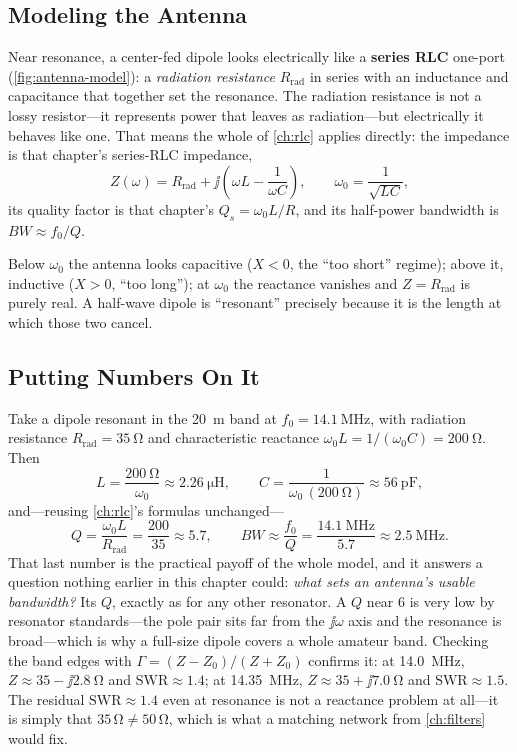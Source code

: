 \subsection{Modeling the Antenna}
Near resonance, a center-fed dipole looks electrically like a \textbf{series RLC}
one-port (\cref{fig:antenna-model}): a \emph{radiation resistance} \(R_{\text{rad}}\)
in series with an inductance and capacitance that together set the resonance. The
radiation resistance is not a lossy resistor---it represents power that leaves as
radiation---but electrically it behaves like one. That means the whole of
\cref{ch:rlc} applies directly: the impedance is that chapter's series-RLC impedance,
\[
Z(\omega)=R_{\text{rad}}+\jj\left(\omega L-\frac{1}{\omega C}\right),
\qquad
\omega_0=\frac{1}{\sqrt{LC}} ,
\]
its quality factor is that chapter's \(Q_s=\omega_0L/R\), and its half-power
bandwidth is \(BW\approx f_0/Q\).

Below \(\omega_0\) the antenna looks capacitive (\(X<0\), the ``too short''
regime); above it, inductive (\(X>0\), ``too long''); at \(\omega_0\) the
reactance vanishes and \(Z=R_{\text{rad}}\) is purely real. A half-wave dipole is
``resonant'' precisely because it is the length at which those two cancel.

\subsection{Putting Numbers On It}
Take a dipole resonant in the \SI{20}{\meter} band at
\(f_0=\SI{14.1}{\mega\hertz}\), with radiation resistance
\(R_{\text{rad}}=\SI{35}{\ohm}\) and characteristic reactance
\(\omega_0L=1/(\omega_0C)=\SI{200}{\ohm}\). Then
\[
L=\frac{\SI{200}{\ohm}}{\omega_0}\approx\SI{2.26}{\micro\henry},
\qquad
C=\frac{1}{\omega_0\,(\SI{200}{\ohm})}\approx\SI{56}{\pico\farad},
\]
and---reusing \cref{ch:rlc}'s formulas unchanged---
\[
Q=\frac{\omega_0L}{R_{\text{rad}}}=\frac{200}{35}\approx5.7,
\qquad
BW\approx\frac{f_0}{Q}=\frac{\SI{14.1}{\mega\hertz}}{5.7}\approx\SI{2.5}{\mega\hertz}.
\]
That last number is the practical payoff of the whole model, and it answers a
question nothing earlier in this chapter could: \emph{what sets an antenna's usable
bandwidth?} Its \(Q\), exactly as for any other resonator. A \(Q\) near \(6\) is very
low by resonator standards---the pole pair sits far from the \(\jj\omega\) axis and
the resonance is broad---which is why a full-size dipole covers a whole amateur band.
Checking the band edges with \(\Gamma=(Z-Z_0)/(Z+Z_0)\) confirms it: at
\SI{14.0}{\mega\hertz}, \(Z\approx35-\jj2.8\ \si{\ohm}\) and
\(\mathrm{SWR}\approx1.4\); at \SI{14.35}{\mega\hertz},
\(Z\approx35+\jj7.0\ \si{\ohm}\) and \(\mathrm{SWR}\approx1.5\). The residual
\(\mathrm{SWR}\approx1.4\) even at resonance is not a reactance problem at all---it is
simply that \(35\,\si{\ohm}\ne50\,\si{\ohm}\), which is what a matching network from
\cref{ch:filters} would fix.

